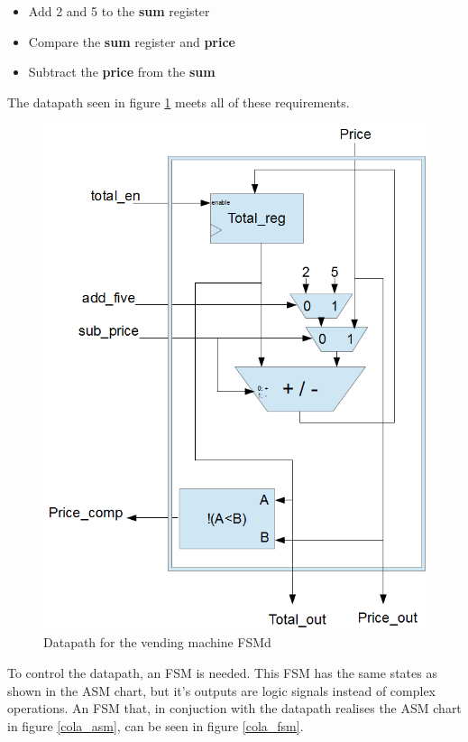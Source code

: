 \begin{itemize}
    \item Add 2 and 5 to the \textbf{sum} register
    \item Compare the \textbf{sum} register and \textbf{price}
    \item Subtract the \textbf{price} from the \textbf{sum}
\end{itemize}

The datapath seen in figure \ref{fsmd_datapath} meets all of these requirements.
\begin{figure}
    \center
    \includegraphics[scale=0.5]{pictures/datapath_cola.png}
    \caption{Datapath for the vending machine FSMd}
    \label{fsmd_datapath}
\end{figure}

To control the datapath, an FSM is needed. This FSM has the same states as
shown in the ASM chart, but it's outputs are logic signals instead of complex operations.
An FSM that, in conjuction with the datapath realises the ASM chart in figure \ref{cola_asm}, can be seen in figure \ref{cola_fsm}.

